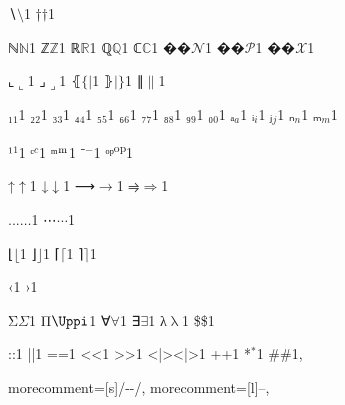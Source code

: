 {{∖}{{\color{symbolcolor}\ensuremath{\setminus}}}1
{†}{{\color{symbolcolor}\ensuremath{\dag}}}1

{ℕ}{{\ensuremath{\mathbb{N}}}}1
{ℤ}{{\ensuremath{\mathbb{Z}}}}1
{ℝ}{{\ensuremath{\mathbb{R}}}}1
{ℚ}{{\ensuremath{\mathbb{Q}}}}1
{ℂ}{{\ensuremath{\mathbb{C}}}}1
{��}{{\ensuremath{\mathcal{N}}}}1
{��}{{\ensuremath{\mathcal{P}}}}1
{��}{{\ensuremath{\mathcal{X}}}}1

{⌞}{{\ensuremath{\llcorner}}}1
{⌟}{{\ensuremath{\lrcorner}}}1
{⦃}{{\ensuremath{\{\!|}}}1
{⦄}{{\ensuremath{|\!\}}}}1
{∥}{{\ensuremath{\|}}}1

{₁}{{\ensuremath{_1}}}1
{₂}{{\ensuremath{_2}}}1
{₃}{{\ensuremath{_3}}}1
{₄}{{\ensuremath{_4}}}1
{₅}{{\ensuremath{_5}}}1
{₆}{{\ensuremath{_6}}}1
{₇}{{\ensuremath{_7}}}1
{₈}{{\ensuremath{_8}}}1
{₉}{{\ensuremath{_9}}}1
{₀}{{\ensuremath{_0}}}1
{ₐ}{{\ensuremath{_a}}}1
{ᵢ}{{\ensuremath{_i}}}1
{ⱼ}{{\ensuremath{_j}}}1
{ₙ}{{\ensuremath{_n}}}1
{ₘ}{{\ensuremath{_m}}}1

{¹}{{\ensuremath{^1}}}1
{ᶜ}{{\color{symbolcolor}\ensuremath{^c}}}1
{ᵐ}{{\color{symbolcolor}\ensuremath{\textsuperscript{m}}}}1
{⁻}{{\ensuremath{^{-}}}}1
{ᵒᵖ}{{\color{symbolcolor}\textsuperscript{op}}}1

{↑}{{\color{symbolcolor}\ensuremath{\uparrow}}}1
{↓}{{\color{symbolcolor}\ensuremath{\downarrow}}}1
{⟶}{{\color{symbolcolor}\ensuremath{\longrightarrow}}}1
{⥤}{{\color{symbolcolor}\ensuremath{\Rightarrow}}}1

{...}{{\ensuremath{\ldots}}}1
{⋯}{{\color{symbolcolor}\ensuremath{\cdots}}}1

{⌊}{{\ensuremath{\lfloor}}}1
{⌋}{{\ensuremath{\rfloor}}}1
{⌈}{{\ensuremath{\lceil}}}1
{⌉}{{\ensuremath{\rceil}}}1

{‹}{{\guilsinglleft}}1
{›}{{\guilsinglright}}1

{Σ}{{\color{symbolcolor}\ensuremath{\Sigma}}}1
{Π}{{\color{symbolcolor}\ensuremath{\Uppi}}}1 %
{∀}{{\color{symbolcolor}\ensuremath{\forall}}}1
{∃}{{\color{symbolcolor}\ensuremath{\exists}}}1
{λ}{{\color{symbolcolor}\ensuremath{\uplambda}}}1
{\$}{{\color{symbolcolor}\$}}1

{:}{{\color{symbolcolor}:}}1
{|}{{\color{symbolcolor}|}}1
{=}{{\color{symbolcolor}=}}1
{<}{{\color{symbolcolor}<}}1
{>}{{\color{symbolcolor}>}}1
{<|>}{{\color{symbolcolor}<|>}}1
{+}{{\color{symbolcolor}+}}1
{*}{{\color{symbolcolor}\ensuremath{{}^{*}}}}1
{\#}{{\color{keywordcolor}\#}}1, %

morecomment=[s]{/-}{-/},
morecomment=[l]{--},

}
